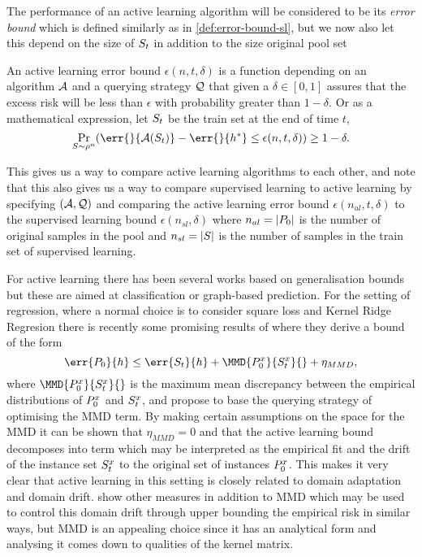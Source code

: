 The performance of an active learning algorithm will be considered to be its
\emph{error bound} which is defined similarly as in \ref{def:error-bound-sl},
but we now also let this depend on the size of \(S_{t}\) in addition to
the size original pool set
\begin{definition}
  \label{def:error-bound-al} An active learning error bound \(\epsilon(n, t,
\delta)\) is a function depending on an algorithm \(\mathcal{A}\) and a querying
strategy \(\mathcal{Q}\) that given a \(\delta \in [0, 1]\) assures that the
excess risk will be less than \(\epsilon\) with probability greater than \(1 -
\delta\). Or as a mathematical expression, let \(S_{t}\) be the train
set at the end of time \(t\),
  \begin{equation}
  \label{eq:error-bound-al} \Pr_{S \sim \rho^n}(\err{}{\algo(S_{t})} -
\err{}{h^{\ast}} \leq \epsilon(n, t, \delta)) \geq 1 - \delta.
  \end{equation}
\end{definition} This gives us a way to compare active learning algorithms to
each other, and note that this also gives us a way to compare supervised
learning to active learning by specifying \((\mathcal{A}, \mathcal{Q})\) and comparing
the active learning error bound \(\epsilon(n_{al}, t, \delta)\) to the
supervised learning bound \(\epsilon(n_{sl}, \delta)\) where \(n_{al} =
|P_{0}|\) is the number of original samples in the pool and \(n_{sl} =
|S|\) is the number of samples in the train set of supervised learning.

For active learning there has been several works based on generalisation bounds
\cite{ganti12_upal,xu19_towar_effic_evaluat_risk_via_herdin,gu12_towar} but
these are aimed at classification or graph-based prediction. For the setting of
regression, where a normal choice is to consider square loss and Kernel Ridge
Regresion there is recently some promising results of
\cite{viering17_nuclear_discr_activ_learn} where they derive a bound of the form
\begin{equation}
\label{eq:viering-mmd-gen-bound} \err{\poolset_{0}}{h} \leq
\err{\trainset_{t}}{h} + \MMD{\poolsetx_{0}}{\trainsetx_{t}}{} + \eta_{MMD},
\end{equation}
where \(\MMD{\poolsetx_{0}}{\trainsetx_{t}}{}\) is the maximum mean discrepancy
between the empirical distributions of \(P^x_{0}\) and \(S^x_{t}\),
and propose to base the querying strategy of optimising the MMD term. By making
certain assumptions on the space for the MMD it can be shown that \(\eta_{MMD} =
0\) and that the active learning bound decomposes into term which may be
interpreted as the empirical fit and the drift of the instance set
\(S^x_{t}\) to the original set of instances \(P^x_{0}\). This
makes it very clear that active learning in this setting is closely related to
domain adaptation and domain drift. \cite{cortes19_adapt_based_gener_discr} show
other measures in addition to MMD which may be used to control this domain drift
through upper bounding the empirical risk in similar ways, but MMD is an
appealing choice since it has an analytical form and analysing it comes down to
qualities of the kernel matrix.

